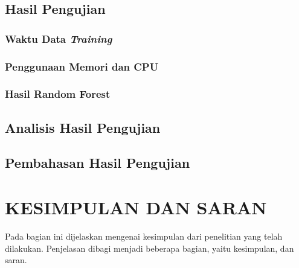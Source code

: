 \documentclass[ugmtesis]{ugmtesis}
\begin{document}
	\section{Hasil Pengujian}
	\label{hasil pengujian}
	

		\subsection{Waktu Data \textit{Training}}
		\label{waktu data training}
		

		\subsection{Penggunaan Memori dan CPU}
		\label{penggunaan memori dan cpu}
		

		\subsection{Hasil Random Forest}
		\label{performa random forest}
		

	\section{Analisis Hasil Pengujian}
	\label{analisis hasil pengujian}
	

	\section{Pembahasan Hasil Pengujian}
	\label{pembahasan hasil pengujian}
	




\chapter{KESIMPULAN DAN SARAN}
\label{kesimpulan dan saran}
Pada bagian ini dijelaskan mengenai kesimpulan dari penelitian yang telah dilakukan. Penjelasan dibagi menjadi beberapa bagian, yaitu kesimpulan, dan saran.
\end{document}
